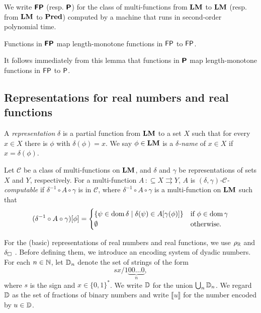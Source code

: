 \documentclass[envcountsame,orivec,oribibl]{llncs}
\newcommand{\pcolon}{\mathpunct{\,:\subseteq}}
\begin{document}
\begin{definition}
 We write $\text{\bfseries \sffamily \upshape FP}$ (resp. $\text{\bfseries \sffamily \upshape P}$) for the class of
 multi-functions from $\mathbf{LM}$ to $\mathbf{LM}$ (resp. from $\mathbf{LM}$ to $\mathbf{Pred}$) 
 computed by a machine that runs
 in second-order polynomial time.
\end{definition}

\begin{lemma}
 Functions in $\text{\bfseries \sffamily \upshape FP}$ map 
 length-monotone functions in $\mathsf{FP}$ to $\mathsf{FP}$.
\end{lemma}

It follows immediately from this lemma that functions in $\text{\bfseries \sffamily \upshape P}$ map 
 length-monotone functions in $\mathsf{FP}$ to $\mathsf{P}$.


\subsection{Representations for real numbers and real functions}

A {\em representation} $\delta$ is a partial function from $\mathbf{LM}$ to a set $X$
such that for every $x \in X$ there is $\phi$ with $\delta (\phi) = x$.
We say $\phi \in \mathbf{LM}$ is a {\em $\delta$-name} of $x \in X$
if $x = \delta(\phi)$.

Let $\mathcal C$ be a class of multi-functions on $\mathbf{LM}$,
and $\delta$ and $\gamma$ be representations of sets $X$ and $Y$, respectively.
For a multi-function $A \pcolon X \rightrightarrows Y$,
$A$ is {\em $(\delta, \gamma)$-$\mathcal C$-computable} if 
$\delta^{-1} \circ A \circ \gamma$ is in $\mathcal C$,
where  $\delta^{-1} \circ A \circ \gamma$ is a multi-function on $\mathbf{LM}$
such that
\begin{equation}
 (\delta^{-1} \circ A \circ \gamma)[\phi] = 
  \begin{cases}
   \{\psi \in \mathop{\rm dom} \delta \mid \delta(\psi) \in A[\gamma(\phi)] \}
   & 
   \text{if } \phi \in \mathop{\rm dom} \gamma 
   \\ 
   \emptyset 
   &
   \text{otherwise.}
  \end{cases}
\end{equation}


For the (basic) representations of real numbers and real functions,
we use $\rho _\mathbb R$ and $\delta _\square$ \cite{kawamura2012complexity}.
Before defining them, we introduce an encoding system of dyadic numbers.
For each $n \in \mathbb N$, let $\mathbb D_n$ denote the set of strings of the form
\begin{equation}
 sx/1\!\underbrace{00\dots0}_{n},
\end{equation}
where $s$ is the sign and $x \in \{0,1\}^*$.
We write $\mathbb D$ for the union $\bigcup _n \mathbb D _n$.
We regard $\mathbb D$ as the set of fractions of binary numbers
and write $\llbracket u \rrbracket$ for the number encoded by $u \in \mathbb D$.
\end{document}

